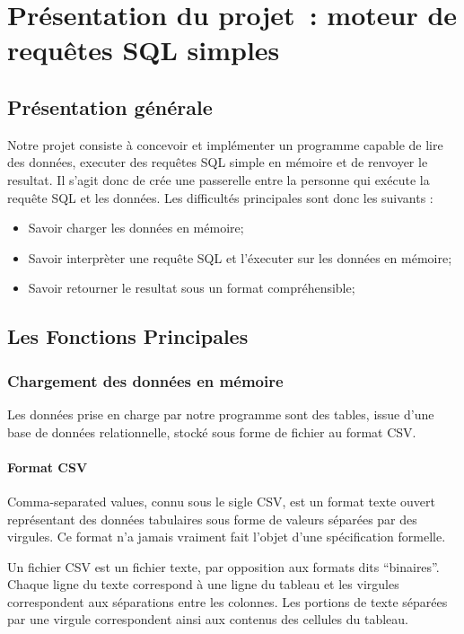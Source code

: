 \documentclass[oneside,13pt,a4paper]{report}
\begin{document}
\chapter{Présentation du projet : moteur de requêtes SQL simples}

\section{Présentation générale}

Notre projet consiste à concevoir et implémenter un programme capable de lire des données, executer des requêtes SQL simple en mémoire et de renvoyer le resultat.
Il s’agit donc de crée une passerelle entre la personne qui exécute la requête SQL et les données.
Les difficultés principales sont donc les suivants :
\vspace{0.3cm}
\begin{itemize}
	\item Savoir charger les données en mémoire;
	\item Savoir interprèter une requête SQL et l'éxecuter sur les données en mémoire;
	\item Savoir retourner le resultat sous un format compréhensible;
\end{itemize}
\vspace{0.3cm}

\section{Les Fonctions Principales}

\subsection{Chargement des données en mémoire}

Les données prise en charge par notre programme sont des tables, issue d'une base de données relationnelle, stocké sous forme de fichier au format CSV.

\subsubsection{Format CSV}
\label{csv}
Comma-separated values, connu sous le sigle CSV, est un format texte ouvert représentant des données tabulaires sous forme de valeurs séparées par des virgules. 
Ce format n'a jamais vraiment fait l'objet d'une spécification formelle.

Un fichier CSV est un fichier texte, par opposition aux formats dits \enquote{binaires}.
Chaque ligne du texte correspond à une ligne du tableau et les virgules correspondent aux séparations entre les colonnes. 
Les portions de texte séparées par une virgule correspondent ainsi aux contenus des cellules du tableau.
\end{document}
